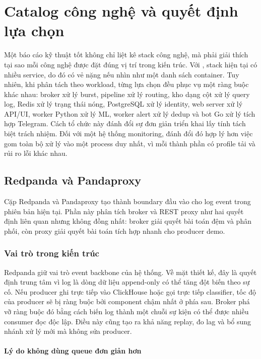 \section{Catalog công nghệ và quyết định lựa chọn}

Một báo cáo kỹ thuật tốt không chỉ liệt kê stack công nghệ, mà phải giải thích tại sao mỗi công nghệ được đặt đúng vị trí trong kiến trúc. Với \LogRider{}, stack hiện tại có nhiều service, do đó có vẻ nặng nếu nhìn như một danh sách container. Tuy nhiên, khi phân tách theo workload, từng lựa chọn đều phục vụ một ràng buộc khác nhau: broker xử lý burst, pipeline xử lý routing, kho dạng cột xử lý query log, Redis xử lý trạng thái nóng, PostgreSQL xử lý identity, web server xử lý API/UI, worker Python xử lý ML, worker alert xử lý dedup và bot Go xử lý tích hợp Telegram. Cách tổ chức này đánh đổi sự đơn giản triển khai lấy tính tách biệt trách nhiệm. Đối với một hệ thống monitoring, đánh đổi đó hợp lý hơn việc gom toàn bộ xử lý vào một process duy nhất, vì mỗi thành phần có profile tải và rủi ro lỗi khác nhau.

\subsection{Redpanda và Pandaproxy}

Cặp Redpanda và Pandaproxy tạo thành boundary đầu vào cho log event trong phiên bản hiện tại. Phần này phân tích broker và REST proxy như hai quyết định liên quan nhưng không đồng nhất: broker giải quyết bài toán đệm và phân phối, còn proxy giải quyết bài toán tích hợp nhanh cho producer demo.

\subsubsection{Vai trò trong kiến trúc}

Redpanda giữ vai trò event backbone của hệ thống. Về mặt thiết kế, đây là quyết định trung tâm vì log là dòng dữ liệu append-only có thể tăng đột biến theo sự cố. Nếu producer ghi trực tiếp vào ClickHouse hoặc gọi trực tiếp classifier, tốc độ của producer sẽ bị ràng buộc bởi component chậm nhất ở phía sau. Broker phá vỡ ràng buộc đó bằng cách biến log thành một chuỗi sự kiện có thể được nhiều consumer đọc độc lập. Điều này cũng tạo ra khả năng replay, đo lag và bổ sung nhánh xử lý mới mà không sửa producer.

\paragraph{Lý do không dùng queue đơn giản hơn}

